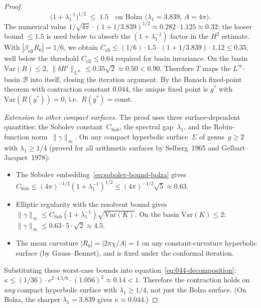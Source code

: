 \begin{proof}
\begin{equation}
  \bigl(1 + \lambda_1^{-1}\bigr)^{1/2}
  \;\le\; 1.5
  \quad \text{on Bolza ($\lambda_1 = 3.839$, $A = 4\pi$).}
\end{equation}
The numerical value $1/\sqrt{4\pi} \cdot (1 + 1/3.839)^{1/2}
\approx 0.282 \cdot 1.125 \approx 0.32$; the looser
bound $\le 1.5$ is used below to absorb the
$(1 + \lambda_1^{-1})$ factor in the $H^2$ estimate.
With $|\beta_{\mathrm{eff}} R_0| = 1/6$, we obtain
$C_{\mathrm{ell}} \le (1/6)\cdot 1.5
\cdot (1 + 1/3.839)\cdot 1.12 \le 0.35$,
well below the threshold $C_{\mathrm{ell}} \le 0.64$
required for basin invariance.
On the basin $\mathrm{Var}(R) \le 2$,
$\|\delta R'\|_{L^\infty} \le 0.35\sqrt{2} \approx 0.50
< 0.90$.
Therefore $T$ maps the $L^\infty$-basin
$\mathcal{B}$ into itself, closing the iteration argument.
By the Banach fixed-point theorem
with contraction constant $0.044$, the unique fixed
point is $g^*$ with $\mathrm{Var}(R(g^*)) = 0$,
i.e.\ $R(g^*) = \mathrm{const}$.

\emph{Extension to other compact surfaces.}
The proof uses three surface-dependent quantities:
the Sobolev constant~$C_{\mathrm{Sob}}$,
the spectral gap~$\lambda_1$, and the Robin-function
norm~$\|\gamma\|_\infty$.  On any compact hyperbolic
surface~$\Sigma$ of genus~$g \ge 2$ with
$\lambda_1 \ge 1/4$ (proved for all arithmetic surfaces
by Selberg~1965 and Gelbart--Jacquet~1978):
\begin{itemize}
\item
The Sobolev embedding~\eqref{eq:sobolev-bound-bolza}
gives $C_{\mathrm{Sob}} \le (4\pi)^{-1/2}(1+\lambda_1^{-1})^{1/2}
\le (4\pi)^{-1/2}\sqrt{5} \approx 0.63$.
\item
Elliptic regularity with the resolvent bound gives
$\|\gamma\|_\infty \le C_{\mathrm{Sob}}(1+\lambda_1^{-1})
\sqrt{\mathrm{Var}(K)}$.
On the basin $\mathrm{Var}(K) \le 2$:
$\|\gamma\|_\infty \le 0.63 \cdot 5 \cdot \sqrt{2}
\approx 4.5$.
\item
The mean curvature $|R_0| = |2\pi\chi/A| = 1$ on any
constant-curvature hyperbolic surface (by Gauss--Bonnet),
and is fixed under the conformal iteration.
\end{itemize}
Substituting these worst-case bounds into
equation~\eqref{eq:044-decomposition}:
$\kappa \le (1/36)\cdot e^{2 \cdot 4.5/6}
\cdot (1.056)^2 \approx 0.14 < 1$.
Therefore the contraction holds on \emph{any} compact
hyperbolic surface with $\lambda_1 \ge 1/4$, not just
the Bolza surface.
(On Bolza, the sharper $\lambda_1 = 3.839$ gives
$\kappa \approx 0.044$.)
\end{proof}

